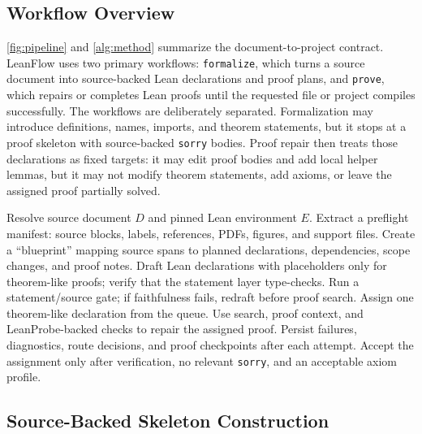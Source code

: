 \documentclass{article}
\newcommand{\method}{LeanFlow\xspace}
\newcommand{\lean}{Lean\xspace}
\begin{document}
\subsection{Workflow Overview}

\cref{fig:pipeline} and \cref{alg:method} summarize the document-to-project contract.
\method uses two primary workflows: \texttt{formalize}, which turns a source document into source-backed \lean declarations and proof plans, and \texttt{prove}, which repairs or completes \lean proofs until the requested file or project compiles successfully.
The workflows are deliberately separated.
Formalization may introduce definitions, names, imports, and theorem statements, but it stops at a proof skeleton with source-backed \texttt{sorry} bodies.
Proof repair then treats those declarations as fixed targets: it may edit proof bodies and add local helper lemmas, but it may not modify theorem statements, add axioms, or leave the assigned proof partially solved.

\begin{algorithm}[t]
\caption{\method agent workflow contract}
\label{alg:method}
\begin{algorithmic}[1]
\STATE Resolve source document $D$ and pinned \lean environment $E$.
\STATE Extract a preflight manifest: source blocks, labels, references, PDFs, figures, and support files.
\STATE Create a ``blueprint'' mapping source spans to planned declarations, dependencies, scope changes, and proof notes.
  \STATE Draft \lean declarations with placeholders only for theorem-like proofs; verify that the statement layer type-checks.
\STATE Run a statement/source gate; if faithfulness fails, redraft before proof search.
  \STATE Assign one theorem-like declaration from the queue.
  \STATE Use search, proof context, and LeanProbe-backed checks to repair the assigned proof.
  \STATE Persist failures, diagnostics, route decisions, and proof checkpoints after each attempt.
  \STATE Accept the assignment only after verification, no relevant \texttt{sorry}, and an acceptable axiom profile.
\ENDWHILE
\end{algorithmic}
\end{algorithm}

\subsection{Source-Backed Skeleton Construction}
\end{document}
